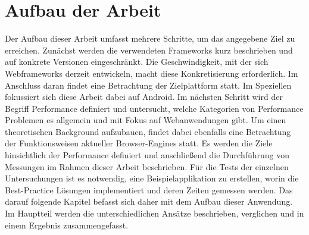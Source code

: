 \section{Aufbau der Arbeit}
Der Aufbau dieser Arbeit umfasst mehrere Schritte, um das angegebene Ziel zu erreichen. Zunächst werden die verwendeten Frameworks kurz beschrieben und auf konkrete Versionen eingeschränkt. Die Geschwindigkeit, mit der sich Webframeworks derzeit entwickeln, macht diese Konkretisierung erforderlich. Im Anschluss daran findet eine Betrachtung der Zielplattform statt. Im Speziellen fokussiert sich diese Arbeit dabei auf Android. Im nächsten Schritt wird der Begriff \glqq  Performance\grqq{} definiert und untersucht, welche Kategorien von Performance Problemen es allgemein und mit Fokus auf Webanwendungen gibt. Um einen theoretischen Background aufzubauen, findet dabei ebenfalls eine Betrachtung der Funktionsweisen aktueller Browser-Engines statt. Es werden die Ziele hinsichtlich der Performance definiert und anschließend die Durchführung von Messungen im Rahmen dieser Arbeit beschrieben. Für die Tests der einzelnen Untersuchungen ist es notwendig, eine Beispielapplikation zu erstellen, worin die Best-Practice Lösungen implementiert und deren Zeiten gemessen werden. Das darauf folgende Kapitel befasst sich daher mit dem Aufbau dieser Anwendung. Im Hauptteil werden die unterschiedlichen Ansätze beschrieben, verglichen und in einem Ergebnis zusammengefasst. 